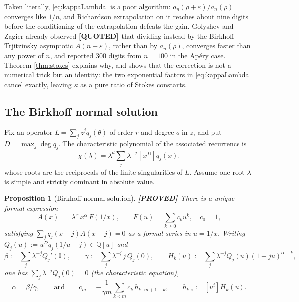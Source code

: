 \documentclass[11pt,reqno]{amsart}
\theoremstyle{plain}
\newtheorem{proposition}[theorem]{Proposition}
\theoremstyle{definition}
\theoremstyle{remark}
\newcommand{\PROVED}{{\normalfont\sffamily\bfseries[PROVED]}}
\newcommand{\QUOTEDMARK}{{\normalfont\sffamily\bfseries[QUOTED]}}
\newcommand{\QUOTED}[1]{\QUOTEDMARK\,#1}
\newcommand{\QQ}{\mathbb{Q}}
\newcommand{\eps}{\varepsilon}
\begin{document}
Taken literally, \eqref{eq:kappaLambda} is a poor algorithm: $a_n(\rho+\eps)/a_n(\rho)$
converges like $1/n$, and Richardson extrapolation on it reaches about nine digits before the
conditioning of the extrapolation defeats the gain. Golyshev and Zagier already observed
\QUOTED{\cite[\S9]{GZ1}} that dividing instead by the Birkhoff--Trjitzinsky asymptotic
$A(n+\eps)$, rather than by $a_n(\rho)$, converges faster than any power of $n$, and reported
$300$ digits from $n=100$ in the Ap\'ery case. Theorem \ref{thm:stokes} explains why, and shows
that the correction is not a numerical trick but an identity: the two exponential factors in
\eqref{eq:kappaLambda} cancel exactly, leaving $\kappa$ as a pure ratio of Stokes constants.

\subsection{The Birkhoff normal solution}\label{sec:birkhoff}
Fix an operator $L=\sum_{j}z^{j}q_j(\theta)$ of order $r$ and degree $d$ in $z$, and put
$D=\max_j\deg q_j$. The characteristic polynomial of the associated recurrence is
\[
  \chi(\lambda)=\lambda^{d}\sum_{j}\lambda^{-j}\,[x^{D}]q_j(x),
\]
whose roots are the reciprocals of the finite singularities of $L$. Assume one root $\lambda$ is
simple and strictly dominant in absolute value.

\begin{proposition}[Birkhoff normal solution]\label{prop:birkhoff} \PROVED\
There is a unique formal expression
\begin{equation}\label{eq:Aform}
  A(x)\;=\;\lambda^{x}\,x^{\alpha}\,F(1/x),\qquad F(u)=\sum_{k\ge 0}c_ku^{k},\quad c_0=1,
\end{equation}
satisfying $\sum_{j}q_j(x-j)A(x-j)=0$ as a formal series in $u=1/x$. Writing
$Q_j(u):=u^{D}q_j(1/u-j)\in\QQ[u]$ and
\[
  \beta:=\sum_j\lambda^{-j}Q_j'(0),\qquad
  \gamma:=\sum_j\lambda^{-j}\,j\,Q_j(0),\qquad
  H_k(u):=\sum_j\lambda^{-j}Q_j(u)(1-ju)^{\alpha-k},
\]
one has $\sum_j\lambda^{-j}Q_j(0)=0$ (the characteristic equation),
\begin{equation}\label{eq:alpha}
  \alpha=\beta/\gamma,\qquad\text{and}\qquad
  c_m=-\frac{1}{\gamma m}\sum_{k<m}c_k\,h_{k,\,m+1-k},\qquad h_{k,i}:=[u^{i}]H_k(u).
\end{equation}
\end{proposition}
\end{document}
